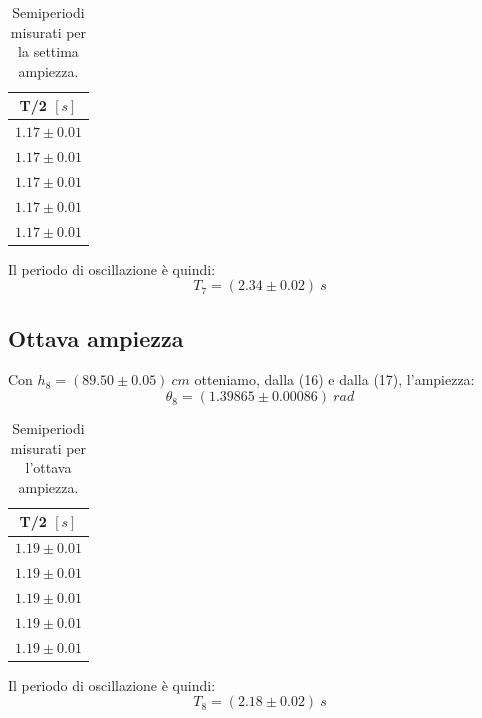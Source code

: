 \documentclass[11pt]{article}
\begin{document}
\begin{table}[H]
\centering
\begin{tabular}{|c|}
\hline
\textbf{T/2 $[s]$} \\
\hline
$1.17\pm 0.01$ \\
$1.17\pm 0.01$ \\
$1.17\pm 0.01$ \\
$1.17\pm 0.01$ \\
$1.17\pm 0.01$ \\
\hline
\end{tabular}
\caption{Semiperiodi misurati per la settima ampiezza.}
\label{tab:}
\end{table}
Il periodo di oscillazione è quindi:
\begin{equation}
    T_7=(2.34\pm 0.02)\ s
\end{equation}

\subsection{Ottava ampiezza}
Con $h_8= (89.50\pm 0.05)\ cm$ otteniamo, dalla (16) e dalla (17), l'ampiezza:
\begin{equation}
    \theta_8 = (1.39865\pm 0.00086)\ rad
\end{equation}

\begin{table}[H]
\centering
\begin{tabular}{|c|}
\hline
\textbf{T/2 $[s]$} \\
\hline
$1.19\pm 0.01$ \\
$1.19\pm 0.01$ \\
$1.19\pm 0.01$ \\
$1.19\pm 0.01$ \\
$1.19\pm 0.01$ \\
\hline
\end{tabular}
\caption{Semiperiodi misurati per l'ottava ampiezza.}
\label{tab:}
\end{table}
Il periodo di oscillazione è quindi:
\begin{equation}
    T_8=(2.18\pm 0.02)\ s
\end{equation}
\end{document}
